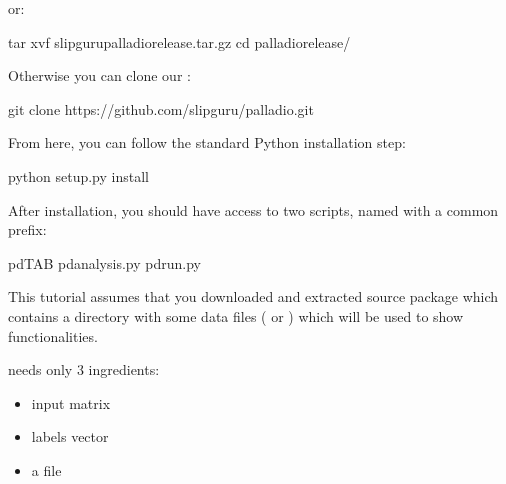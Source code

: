 \documentclass[letterpaper,10pt,english]{sphinxmanual}
\begin{document}
or:

\begin{sphinxVerbatim}[commandchars=\\\{\}]
\PYGZdl{} tar xvf slipguru\PYGZhy{}palladio\PYGZhy{}\textbar{}release\textbar{}.tar.gz
\PYGZdl{} cd palladio\PYGZhy{}\textbar{}release\textbar{}/
\end{sphinxVerbatim}

Otherwise you can clone our :

\begin{sphinxVerbatim}[commandchars=\\\{\}]
\PYGZdl{} git clone https://github.com/slipguru/palladio.git
\end{sphinxVerbatim}

From here, you can follow the standard Python installation step:

\begin{sphinxVerbatim}[commandchars=\\\{\}]
\PYGZdl{} python setup.py install
\end{sphinxVerbatim}

After  installation, you should have access to two scripts,
named with a common  prefix:

\begin{sphinxVerbatim}[commandchars=\\\{\}]
\PYGZdl{} pd\PYGZus{}\PYGZlt{}TAB\PYGZgt{}
pd\PYGZus{}analysis.py    pd\PYGZus{}run.py
\end{sphinxVerbatim}

This tutorial assumes that you downloaded and extracted 
source package which contains a  directory with some data files ( or ) which will be used to show  functionalities.

 needs only 3 ingredients:
\begin{itemize}
\item {} 
 input matrix

\item {} 
 labels vector

\item {} 
a  file

\end{itemize}
\end{document}
